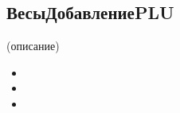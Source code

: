 \subsection{ВесыДобавлениеPLU}\label{512} (описание)







\begin{itemize}[label={--}]	
	\item 
		\item 
		\item 	
	
	

	
	
	
\end{itemize}

